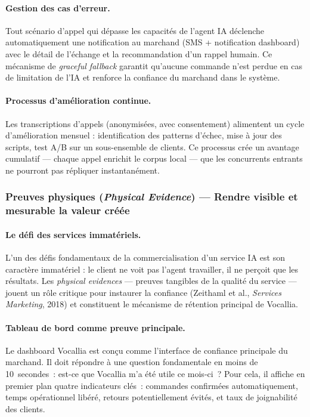 \paragraph{Gestion des cas d'erreur.}
Tout scénario d'appel qui dépasse les capacités de l'agent IA déclenche
automatiquement une notification au marchand (SMS + notification dashboard) avec
le détail de l'échange et la recommandation d'un rappel humain. Ce mécanisme
de \textit{graceful fallback} garantit qu'aucune commande n'est perdue en cas
de limitation de l'IA et renforce la confiance du marchand dans le système.

\paragraph{Processus d'amélioration continue.}
Les transcriptions d'appels (anonymisées, avec consentement) alimentent un
cycle d'amélioration mensuel : identification des patterns d'échec, mise à jour
des scripts, test A/B sur un sous-ensemble de clients. Ce processus crée un
avantage cumulatif --- chaque appel enrichit le corpus local --- que les
concurrents entrants ne pourront pas répliquer instantanément.

\subsubsection{Preuves physiques (\textit{Physical Evidence}) --- Rendre
visible et mesurable la valeur créée}

\paragraph{Le défi des services immatériels.}
L'un des défis fondamentaux de la commercialisation d'un service IA est son
caractère immatériel : le client ne voit pas l'agent travailler, il ne perçoit
que les résultats. Les \textit{physical evidences} --- preuves tangibles de
la qualité du service --- jouent un rôle critique pour instaurer la
confiance (Zeithaml et al., \textit{Services Marketing}, 2018) et constituent
le mécanisme de rétention principal de Vocallia.

\paragraph{Tableau de bord comme preuve principale.}
Le dashboard Vocallia est conçu comme l'interface de confiance principale du
marchand. Il doit répondre à une question fondamentale en moins de 10~secondes~:
\og{}est-ce que Vocallia m'a été utile ce mois-ci~?\fg{} Pour cela, il affiche en
premier plan quatre indicateurs clés~: commandes confirmées automatiquement,
temps opérationnel libéré, retours potentiellement évités, et taux de
joignabilité des clients.

